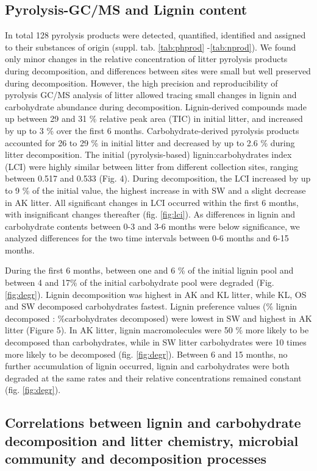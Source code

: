 \subsection*{Pyrolysis-GC/MS and Lignin content}
In total 128 pyrolysis products were detected, quantified, identified and assigned to their substances of origin (suppl. tab. \ref{tab:phprod} -\ref{tab:nprod}). We found only minor changes in the relative concentration of litter pyrolysis products during decomposition, and differences between sites were small but well preserved during decomposition. However, the high precision and reproducibility of pyrolysis GC/MS analysis of litter allowed tracing small changes in lignin and carbohydrate abundance during decomposition. Lignin-derived compounds made up between 29 and 31 \% relative peak area (TIC) in initial litter, and increased by up to 3 \% over the first 6 months. Carbohydrate-derived pyrolysis products accounted for 26 to 29 \% in initial litter and decreased by up to 2.6 \% during litter decomposition. The initial (pyrolysis-based) lignin:carbohydrates index (LCI) were highly similar between litter from different collection sites, ranging between 0.517 and 0.533 (Fig. 4). During decomposition, the LCI increased by up to 9 \% of the initial value, the highest increase in with SW and a slight decrease in AK litter. All significant changes in LCI  occurred within the first 6 months, with insignificant changes thereafter (fig. \ref{fig:lci}). As differences in lignin and carbohydrate contents between 0-3 and 3-6 months were below significance, we analyzed differences for the two time intervals between 0-6 months and 6-15 months.

During the first 6 months, between one and 6 \% of the initial lignin pool and between 4 and 17\% of the initial carbohydrate pool were degraded (Fig. \ref{fig:degr}). Lignin decomposition was highest in AK and KL litter, while KL, OS and SW decomposed carbohydrates fastest. Lignin preference values (\% lignin decomposed : \%carbohydrates decomposed) were lowest in SW and highest in AK litter (Figure 5). In AK litter, lignin macromolecules were 50 \% more likely to be decomposed than carbohydrates, while in SW litter carbohydrates were 10 times more likely to be decomposed (fig. \ref{fig:degr}). Between 6 and 15 months, no further accumulation of lignin occurred, lignin and carbohydrates were both degraded at the same rates and their relative concentrations remained constant (fig. \ref{fig:degr}).

\subsection*{Correlations between lignin and carbohydrate decomposition and litter chemistry, microbial community and decomposition processes}

